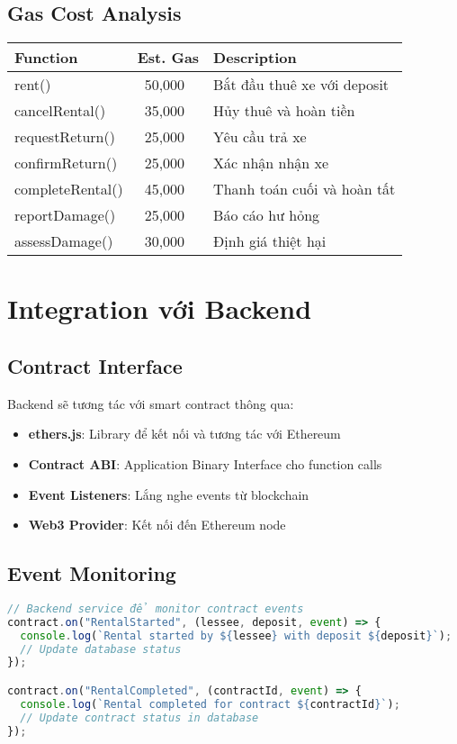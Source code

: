 \documentclass[12pt,a4paper]{article}
\begin{document}
\subsection{Gas Cost Analysis}
\begin{longtable}{|p{4cm}|p{3cm}|p{7cm}|}
\hline
\textbf{Function} & \textbf{Est. Gas} & \textbf{Description} \\
\hline
rent() & ~50,000 & Bắt đầu thuê xe với deposit \\
\hline
cancelRental() & ~35,000 & Hủy thuê và hoàn tiền \\
\hline
requestReturn() & ~25,000 & Yêu cầu trả xe \\
\hline
confirmReturn() & ~25,000 & Xác nhận nhận xe \\
\hline
completeRental() & ~45,000 & Thanh toán cuối và hoàn tất \\
\hline
reportDamage() & ~25,000 & Báo cáo hư hỏng \\
\hline
assessDamage() & ~30,000 & Định giá thiệt hại \\
\hline
\end{longtable}

\section{Integration với Backend}

\subsection{Contract Interface}
Backend sẽ tương tác với smart contract thông qua:
\begin{itemize}
\item \textbf{ethers.js}: Library để kết nối và tương tác với Ethereum
\item \textbf{Contract ABI}: Application Binary Interface cho function calls
\item \textbf{Event Listeners}: Lắng nghe events từ blockchain
\item \textbf{Web3 Provider}: Kết nối đến Ethereum node
\end{itemize}

\subsection{Event Monitoring}
\begin{lstlisting}[language=JavaScript, caption=Lắng nghe events từ contract]
// Backend service để monitor contract events
contract.on("RentalStarted", (lessee, deposit, event) => {
  console.log(`Rental started by ${lessee} with deposit ${deposit}`);
  // Update database status
});

contract.on("RentalCompleted", (contractId, event) => {
  console.log(`Rental completed for contract ${contractId}`);
  // Update contract status in database
});
\end{lstlisting}
\end{document}
